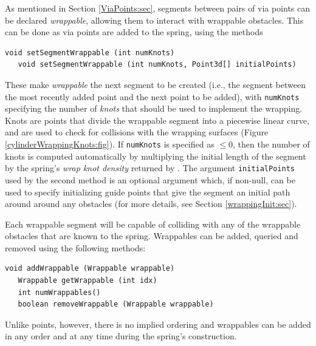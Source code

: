 As mentioned in Section \ref{ViaPoints:sec}, segments between pairs of
via points can be declared {\it wrappable}, allowing them to interact
with wrappable obstacles. This can be done as via points are added
to the spring, using the methods
%
\begin{lstlisting}[]
   void setSegmentWrappable (int numKnots)
   void setSegmentWrappable (int numKnots, Point3d[] initialPoints)
\end{lstlisting}
%
These make {\it wrappable} the next segment to be created (i.e., the segment
between the most recently added point and the next point to be added), with
{\tt numKnots} specifying the number of {\it knots} that should be used to
implement the wrapping. Knots are points that divide the wrappable segment into
a piecewise linear curve, and are used to check for collisions with the
wrapping surfaces (Figure \ref{cylinderWrappingKnots:fig}).  If {\tt numKnots}
is specified as $\le 0$, then the number of knots is computed automatically by
multiplying the initial length of the segment by the spring's {\it wrap knot
density} returned by .
The argument {\tt initialPoints} used by the second method is an optional
argument which, if non-null, can be used to specify initializing guide points
that give the segment an initial path around around any obstacles (for more
details, see Section \ref{wrappingInit:sec}).

Each wrappable segment will be capable of colliding with any of the
wrappable obstacles that are known to the spring.  Wrappables can be
added, queried and removed using the following methods:
%
\begin{lstlisting}[]
   void addWrappable (Wrappable wrappable)
   Wrappable getWrappable (int idx)
   int numWrappables()
   boolean removeWrappable (Wrappable wrappable)
\end{lstlisting}
%
Unlike points, however, there is no implied ordering and wrappables
can be added in any order and at any time during the spring's
construction.

